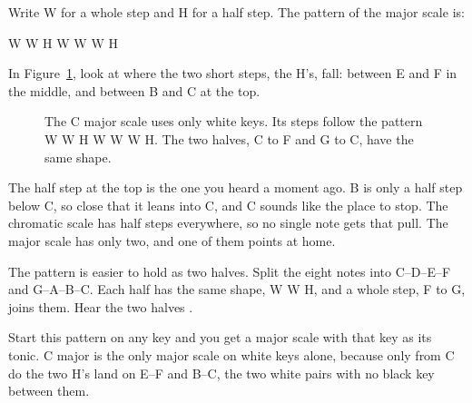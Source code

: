 Write W for a whole step and H for a half step. The pattern of the major scale is:
\begin{center}
W \quad W \quad H \quad W \quad W \quad W \quad H
\end{center}
In Figure~\ref{fig:c-major-steps}, look at where the two short steps, the H's, fall: between E and F in the middle, and between B and C at the top.

\begin{figure}[htbp]
\centering
{}
\caption{The C major scale uses only white keys. Its steps follow the pattern W W H W W W H. The two halves, C to F and G to C, have the same shape.}
\label{fig:c-major-steps}
\end{figure}

The half step at the top is the one you heard a moment ago. B is only a half step below C, so close that it leans into C, and C sounds like the place to stop. The chromatic scale has half steps everywhere, so no single note gets that pull. The major scale has only two, and one of them points at home.

The pattern is easier to hold as two halves. Split the eight notes into C--D--E--F and G--A--B--C. Each half has the same shape, W W H, and a whole step, F to G, joins them. Hear the two halves .

Start this pattern on any key and you get a major scale with that key as its tonic. C major is the only major scale on white keys alone, because only from C do the two H's land on E--F and B--C, the two white pairs with no black key between them.

